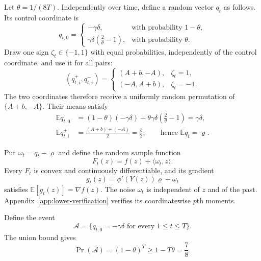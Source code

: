 \documentclass[11pt,letterpaper]{article}
\theoremstyle{definition}
\newcommand{\E}{\mathbb E}
\newcommand{\grad}{\nabla}
\begin{document}
Let $\theta=1/(8T)$.  Independently over time, define a random vector $q_t$ as follows.  Its control coordinate is
\begin{equation}
q_{t,0}=
\begin{cases}
-\gamma\delta,&\text{with probability }1-\theta,\\
\gamma\delta(\frac{2}{\theta}-1),&\text{with probability }\theta.
\end{cases}
\label{eq:control-oracle}
\end{equation}
Draw one sign $\zeta_t\in\{-1,1\}$ with equal probabilities, independently
of the control coordinate, and use it for all pairs:
\begin{equation}
(q_{t,i}^{+},q_{t,i}^{-})=
\begin{cases}
(A+b,-A),&\zeta_t=1,\\
(-A,A+b),&\zeta_t=-1.
\end{cases}
\label{eq:pair-oracle}
\end{equation}
The two coordinates therefore receive a uniformly random permutation of
$\{A+b,-A\}$. Their means satisfy
\begin{equation}
\begin{aligned}
\E q_{t,0}&=(1-\theta)(-\gamma\delta)
+\theta\gamma\delta\left(\frac2\theta-1\right)=\gamma\delta,\\
\E q_{t,i}^{\pm}&=\frac{(A+b)+(-A)}2=\frac b2,
\qquad\text{hence }\E q_t=\varrho.
\end{aligned}
\label{eq:q-mean}
\end{equation}

Put $\omega_t=q_t-\varrho$ and define the random sample function
\begin{equation}
F_t(z)=f(z)+\langle\omega_t,z\rangle.
\label{eq:sample-function}
\end{equation}
Every $F_t$ is convex and continuously differentiable, and its gradient
\begin{equation}
g_t(z)=\phi'(Y(z))\varrho+\omega_t
\label{eq:lower-gradient-oracle}
\end{equation}
satisfies $\E[g_t(z)]=\grad f(z)$.  The noise $\omega_t$ is independent of $z$ and of the past.  Appendix~\ref{app:lower-verification} verifies its coordinatewise $p$th moments.

Define the event
\begin{equation}
\mathcal A=\{q_{t,0}=-\gamma\delta\text{ for every }1\le t\le T\}.
\label{eq:common-control-event}
\end{equation}
The union bound gives
\begin{equation}
\Pr(\mathcal A)=(1-\theta)^T\ge1-T\theta=\frac78.
\label{eq:control-event-prob}
\end{equation}
\end{document}
